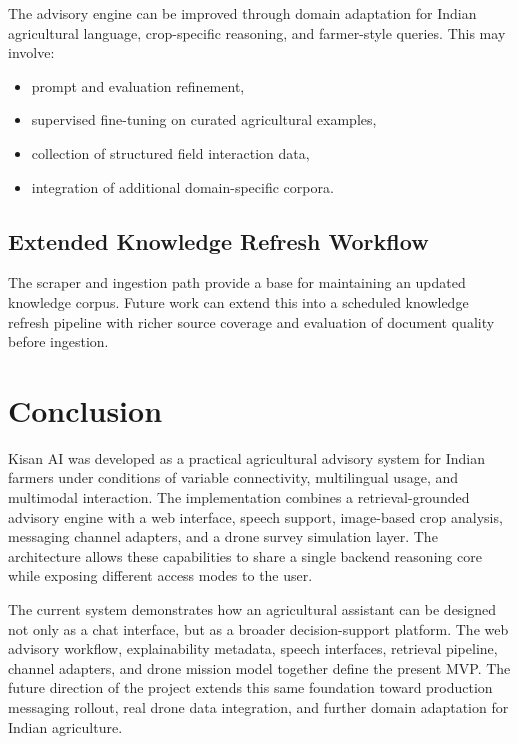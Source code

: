 \documentclass[11pt,a4paper]{article}
\begin{document}
The advisory engine can be improved through domain adaptation for Indian agricultural language, crop-specific reasoning, and farmer-style queries. This may involve:

\begin{itemize}
  \item prompt and evaluation refinement,
  \item supervised fine-tuning on curated agricultural examples,
  \item collection of structured field interaction data,
  \item integration of additional domain-specific corpora.
\end{itemize}

\subsection{Extended Knowledge Refresh Workflow}

The scraper and ingestion path provide a base for maintaining an updated knowledge corpus. Future work can extend this into a scheduled knowledge refresh pipeline with richer source coverage and evaluation of document quality before ingestion.

\section{Conclusion}

Kisan AI was developed as a practical agricultural advisory system for Indian farmers under conditions of variable connectivity, multilingual usage, and multimodal interaction. The implementation combines a retrieval-grounded advisory engine with a web interface, speech support, image-based crop analysis, messaging channel adapters, and a drone survey simulation layer. The architecture allows these capabilities to share a single backend reasoning core while exposing different access modes to the user.

The current system demonstrates how an agricultural assistant can be designed not only as a chat interface, but as a broader decision-support platform. The web advisory workflow, explainability metadata, speech interfaces, retrieval pipeline, channel adapters, and drone mission model together define the present MVP. The future direction of the project extends this same foundation toward production messaging rollout, real drone data integration, and further domain adaptation for Indian agriculture.

\appendix
\end{document}
